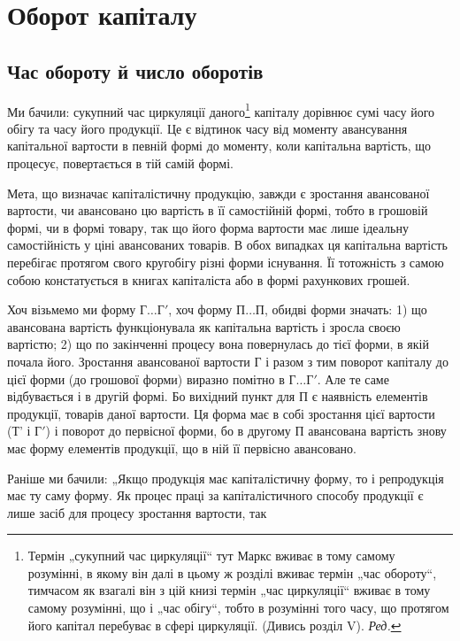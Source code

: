 
\chapter{Оборот капіталу}

\section{Час обороту й число оборотів}

Ми бачили: сукупний час циркуляції даного\footnote*{
Термін „сукупний час циркуляції“ тут Маркс вживає в тому самому розумінні,
в якому він далі в цьому ж розділі вживає термін „час обороту“, тимчасом
як взагалі він з цій книзі термін „час циркуляції“ вживає в тому самому
розумінні, що і „час обігу“, тобто в розумінні того часу, що протягом його капітал
перебуває в сфері циркуляції. (Дивись розділ V). \emph{Ред.}
} капіталу дорівнює сумі
часу його обігу та часу його продукції. Це є відтинок часу від моменту
авансування капітальної вартости в певній формі до моменту, коли капітальна
вартість, що процесує, повертається в тій самій формі.

Мета, що визначає капіталістичну продукцію, завжди є зростання
авансованої вартости, чи авансовано цю вартість в її самостійній формі,
тобто в грошовій формі, чи в формі товару, так що його форма вартости
має лише ідеальну самостійність у ціні авансованих товарів.
В обох випадках ця капітальна вартість перебігає протягом свого кругобігу
різні форми існування. Її тотожність з самою собою констатується
в книгах капіталіста або в формі рахункових грошей.

Хоч візьмемо ми форму $Г\dots{} Г'$, хоч форму $П\dots{} П$, обидві форми
значать: 1) що авансована вартість функціонувала як капітальна вартість
і зросла своєю вартістю; 2) що по закінченні процесу вона повернулась
до тієї форми, в якій почала його. Зростання авансованої вартости Г і
разом з тим поворот капіталу до цієї форми (до грошової форми) виразно
помітно в $Г\dots{} Г'$. Але те саме відбувається і в другій формі. Бо
вихідний пункт для П є наявність елементів продукції, товарів даної
вартости. Ця форма має в собі зростання цієї вартости (Т' і $Г'$) і поворот
до первісної форми, бо в другому П авансована вартість
знову має форму елементів продукції, що в ній її первісно авансовано.

Раніше ми бачили: „Якщо продукція має капіталістичну форму, то
і репродукція має ту саму форму. Як процес праці за капіталістичного
способу продукції є лише засіб для процесу зростання вартости, так
\parbreak{}  %
